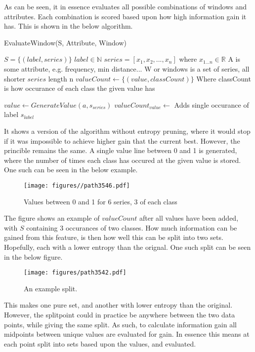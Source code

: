 \documentclass[10pt]{article}
\begin{document}
As can be seen, it in essence evaluates all possible combinations of windows and attributes. Each combination is scored based upon how high information gain it has. This is shown in the below algorithm.

\begin{algorithm}
\caption{EvaluateWindow(S, Attribute, Window)}\label{alg:feature_scaling}
\begin{algorithmic}
\Require $S = \{(label, series)\}$
\Require $label \in \mathbb{N}$
\Require $series = [x_1, x_2, ..., x_n]$ where $x_{1 ... n} \in \mathbb{R}$
\Require A is some attribute, e.g. frequency, min distance...
\Require W or windows is a set of series, all shorter $series$ length n
\State $valueCount \gets \{(value, classCount)\}$ \Comment Where classCount is how occurance of each class the given value has

	\State $value \gets GenerateValue(a, s_{series})$
	\State $valueCount_{value} \gets$ Adds single occurance of label $s_{label}$
\EndFor

\end{algorithmic}
\end{algorithm}

It shows a version of the algorithm without entropy pruning, where it would stop if it was impossible to achieve higher gain that the current best. However, the princible remains the same. A single value line between 0 and 1 is generated, where the number of times each class has occured at the given value is stored. One such can be seen in the below example.

\begin{figure}[htp]
\centering
\texttt{[image: figures//path3546.pdf]}
\caption{Values between 0 and 1 for 6 series, 3 of each class}
\label{}
\end{figure}

The figure shows an example of $valueCount$ after all values have been added, with $S$ containing 3 occurances of two classes. How much information can be gained from this feature, is then how well this can be split into two sets. Hopefully, each with a lower entropy than the orignal. One such split can be seen in the below figure.

\begin{figure}[htp]
\centering
\texttt{[image: figures/path3542.pdf]}
\caption{An example split.}
\label{}
\end{figure}

This makes one pure set, and another with lower entropy than the original. However, the splitpoint could in practice be anywhere between the two data points, while giving the same split. As such, to calculate information gain all midpoints between unique values are evaluated for gain. In essence this means at each point split into sets based upon the values, and evaluated.
\end{document}
